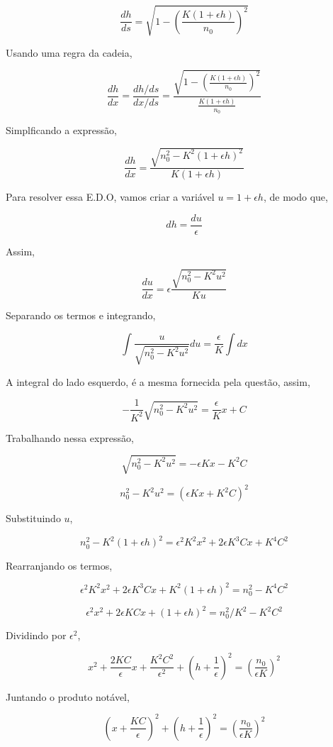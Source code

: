 \documentclass[11pt]{article}
\begin{document}
\begin{pproblem}
\begin{pssolution*}{}{}
\begin{alternativas}
        \[\frac{dh}{ds} = \sqrt{1- \left(\frac{K(1+\epsilon h)}{n_0}\right)^2}\]

        Usando uma regra da cadeia, 

        \[\frac{dh}{dx} = \frac{dh/ds}{dx/ds} = \frac{\sqrt{1- \left(\frac{K(1+\epsilon h)}{n_0}\right)^2}}{\frac{K(1+\epsilon h)}{n_0}}\]

        Simplficando a expressão, 

        \[\frac{dh}{dx} = \frac{\sqrt{n_0^2 - K^2(1+\epsilon h)^2}}{K(1+\epsilon h)}\]

        Para resolver essa E.D.O, vamos criar a variável \(u = 1+\epsilon h\), de modo que, 

        \[dh = \frac{du}{\epsilon}\]

        Assim, 

        \[\frac{du}{dx} = \epsilon\frac{\sqrt{n_0^2 - K^2u^2}}{Ku}\]

        Separando os termos e integrando, 

        \[\int \frac{u}{\sqrt{n_0^2 - K^2u^2}} du = \frac{\epsilon}{K}\int dx\]
    
        A integral do lado esquerdo, é a mesma fornecida pela questão, assim, 

        \[-\frac{1}{K^2}\sqrt{n_0^2-K^2u^2} = \frac{\epsilon}{K}x + C\]

        Trabalhando nessa expressão, 

        \[\sqrt{n_0^2-K^2u^2} = -\epsilon K x - K^2C\]

        \[n_0^2-K^2u^2 = (\epsilon K x + K^2C)^2\]

        Substituindo \(u\), 

        \[n_0^2-K^2(1+\epsilon h)^2 = \epsilon^2K^2x^2 + 2\epsilon K^3 C x + K^4C^2\]

        Rearranjando os termos, 

        \[\epsilon^2K^2x^2 + 2\epsilon K^3 C x + K^2(1+\epsilon h)^2 = n_0^2 - K^4C^2 \]

        \[\epsilon^2x^2 + 2\epsilon K C x + (1+\epsilon h)^2 = n_0^2/K^2 - K^2C^2 \]

        Dividindo por \(\epsilon^2\), 

        \[x^2 + \frac{2KC}{\epsilon}x + \frac{K^2C^2}{\epsilon^2} + \left(h+\frac{1}{\epsilon}\right)^2 = \left(\frac{n_0}{\epsilon K}\right)^2\]

        Juntando o produto notável, 

        \[\boxed{\left(x + \frac{KC}{\epsilon}\right)^2+\left(h+\frac{1}{\epsilon}\right)^2 = \left(\frac{n_0}{\epsilon K}\right)^2}\]
   

\end{alternativas}
\end{pssolution*}
\end{pproblem}
\end{document}

